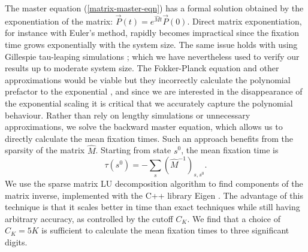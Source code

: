\documentclass[a4paper,10pt]{article}
\numberwithin{equation}{section} %
\begin{document}
The master equation (\ref{matrix-master-eqn}) has a formal solution obtained by the exponentiation of the matrix: $\vec{P}(t) = e^{\hat{M} t}\vec{P}(0)$. 
Direct matrix exponentiation, for instance with Euler's method, rapidly becomes impractical since the fixation time grows exponentially with the system size. 
The same issue holds with using Gillespie tau-leaping simulations \cite{Gillespie1977,Cao2006}; which we have nevertheless used to verify our results up to moderate system size. 
The Fokker-Planck equation and other approximations would be viable but they incorrectly calculate the polynomial prefactor to the exponential \cite{Ovaskainen2010}, and since we are interested in the disappearance of the exponential scaling it is critical that we accurately capture the polynomial behaviour. %
Rather than rely on lengthy simulations or unnecessary approximations, we solve the backward master equation, which allows us to directly calculate the mean fixation times. %
Such an approach benefits from the sparsity of the matrix $\hat{M}$. 
Starting from state $s^0$, the mean fixation time is \cite{Iyer-Biswas2015}
\begin{equation} \label{explicit-tau}
 \tau(s^0) = -\sum_s \left(\hat{M}^{-1}\right)_{s,s^0}. 
\end{equation}
We use the sparse matrix LU decomposition algorithm to find components of the matrix inverse, implemented with the C++ library Eigen \cite{eigenweb}. 
The advantage of this technique is that it scales better in time than exact techniques while still having arbitrary accuracy, as controlled by the cutoff $C_K$. %
We find that a choice of $C_K=5K$ is sufficient to calculate the mean fixation times to three significant digits. 
\end{document}

